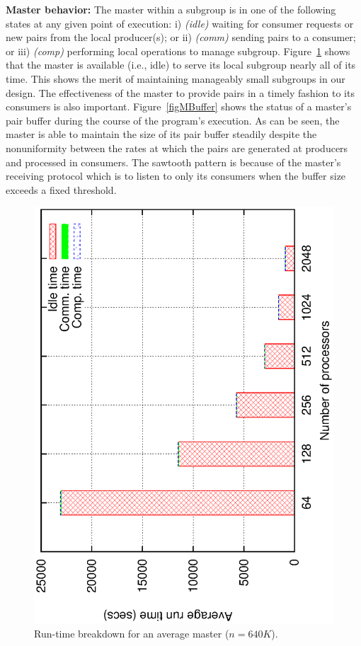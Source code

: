 \documentclass[10pt,journal,letterpaper,compsoc]{IEEEtran}
\begin{document}
{\bf Master behavior:} The master within a subgroup is in one of the following states at any given point of execution: i) \emph{(idle)} waiting for consumer requests or new pairs from the local producer(s); or ii) \emph{(comm)} sending pairs to a consumer; or iii) \emph{(comp)} performing local operations to manage subgroup. Figure~\ref{figMasterBreakdown} shows that the master is available (i.e., idle) to serve its local subgroup nearly all of its time. This shows the merit of maintaining manageably small subgroups in our design. 
The effectiveness of the master to provide pairs in a timely fashion to its consumers is also important. Figure~\ref{figMBuffer} shows the status of a master's pair buffer during the course of the program's execution. As can be seen, the master is able to maintain the size of its pair buffer steadily despite the nonuniformity between the rates at which the pairs are generated at producers and processed in consumers. The sawtooth pattern is because of the master's receiving protocol which is to listen to only its consumers when the buffer size exceeds a fixed threshold. 


\begin{figure}[thb]
\centerline{
						\includegraphics[angle=-90, scale=0.5]{msBreak.eps}
            }
\caption{
Run-time breakdown for an average master ($n=640K$).
}
\label{figMasterBreakdown}
\end{figure}
\end{document}

